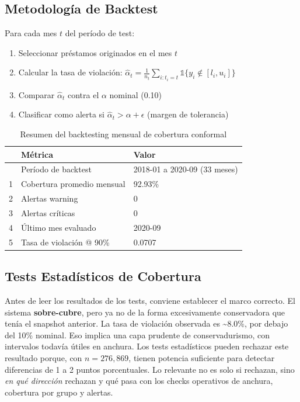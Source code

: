 \documentclass[
  spanish,
  11pt,
  letterpaper,
]{scrbook}
\providecommand{\tightlist}{%
  \setlength{\itemsep}{0pt}\setlength{\parskip}{0pt}}
\theoremstyle{plain}
\theoremstyle{remark}
\begin{document}
\subsection{Metodología de Backtest}\label{metodologuxeda-de-backtest}

Para cada mes \(t\) del período de test:

\begin{enumerate}
\def\labelenumi{\arabic{enumi}.}
\tightlist
\item
  Seleccionar préstamos originados en el mes \(t\)
\item
  Calcular la tasa de violación:
  \(\hat{\alpha}_t = \frac{1}{n_t}\sum_{i: t_i = t} \mathbb{1}\{y_i \notin [l_i, u_i]\}\)
\item
  Comparar \(\hat{\alpha}_t\) contra el \(\alpha\) nominal (0.10)
\item
  Clasificar como alerta si \(\hat{\alpha}_t > \alpha + \epsilon\)
  (margen de tolerancia)
\end{enumerate}

{

\begin{longtable}[]{@{}lll@{}}

\caption{\label{tbl-backtest-monthly}Resumen del backtesting mensual de
cobertura conformal}

\tabularnewline

\toprule\noalign{}
& Métrica & Valor \\
\midrule\noalign{}
\endhead
\bottomrule\noalign{}
\endlastfoot
0 & Período de backtest & 2018-01 a 2020-09 (33 meses) \\
1 & Cobertura promedio mensual & 92.93\% \\
2 & Alertas warning & 0 \\
3 & Alertas críticas & 0 \\
4 & Último mes evaluado & 2020-09 \\
5 & Tasa de violación @ 90\% & 0.0707 \\

\end{longtable}

}

\subsection{Tests Estadísticos de
Cobertura}\label{tests-estaduxedsticos-de-cobertura}

Antes de leer los resultados de los tests, conviene establecer el marco
correcto. El sistema \textbf{sobre-cubre}, pero ya no de la forma
excesivamente conservadora que tenía el snapshot anterior. La tasa de
violación observada es \textasciitilde8.0\%, por debajo del 10\%
nominal. Eso implica una capa prudente de conservadurismo, con
intervalos todavía útiles en anchura. Los tests estadísticos pueden
rechazar este resultado porque, con \(n = 276{,}869\), tienen potencia
suficiente para detectar diferencias de 1 a 2 puntos porcentuales. Lo
relevante no es solo si rechazan, sino \emph{en qué dirección} rechazan
y qué pasa con los checks operativos de anchura, cobertura por grupo y
alertas.
\end{document}
